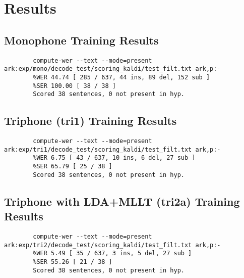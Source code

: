 %
%
%                 

\chapter{Results}
\label{sec:appendixc}

\section*{Monophone Training Results}

{\lstset{
		basicstyle=\ttfamily\small,
		frame=single,
		breaklines=true,
		breakatwhitespace=true,
		columns=fullflexible
	}
	\begin{lstlisting}
		compute-wer --text --mode=present ark:exp/mono/decode_test/scoring_kaldi/test_filt.txt ark,p:- 
		%WER 44.74 [ 285 / 637, 44 ins, 89 del, 152 sub ]
		%SER 100.00 [ 38 / 38 ]
		Scored 38 sentences, 0 not present in hyp.
	\end{lstlisting}
}

\vspace{1em}

\section*{Triphone (tri1) Training Results}

{\lstset{
		basicstyle=\ttfamily\small,
		frame=single,
		breaklines=true,
		breakatwhitespace=true,
		columns=fullflexible
	}
	\begin{lstlisting}
		compute-wer --text --mode=present ark:exp/tri1/decode_test/scoring_kaldi/test_filt.txt ark,p:- 
		%WER 6.75 [ 43 / 637, 10 ins, 6 del, 27 sub ]
		%SER 65.79 [ 25 / 38 ]
		Scored 38 sentences, 0 not present in hyp.
	\end{lstlisting}
}

\vspace{1em}

\section*{Triphone with LDA+MLLT (tri2a) Training Results}

{\lstset{
		basicstyle=\ttfamily\small,
		frame=single,
		breaklines=true,
		breakatwhitespace=true,
		columns=fullflexible
	}
	\begin{lstlisting}
		compute-wer --text --mode=present ark:exp/tri2/decode_test/scoring_kaldi/test_filt.txt ark,p:- 
		%WER 5.49 [ 35 / 637, 3 ins, 5 del, 27 sub ]
		%SER 55.26 [ 21 / 38 ]
		Scored 38 sentences, 0 not present in hyp.
	\end{lstlisting}
}

